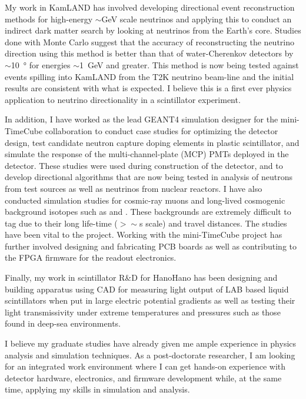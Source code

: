 \documentclass[a4paper,10pt]{article} %
\begin{document}
My work in KamLAND has involved developing directional event reconstruction
methods for high-energy $\sim$\si{\giga\electronvolt} scale neutrinos and
applying this to conduct an indirect dark matter search by looking at neutrinos
from the Earth's core.
Studies done with Monte Carlo suggest that the accuracy of reconstructing the
neutrino direction using this method is better than that of water-Cherenkov
detectors by $\sim$\SI{10}{\degree} for energies
$\sim$\SI{1}{\giga\electronvolt} and greater.
This method is now being tested against events spilling into KamLAND from the
T2K neutrino beam-line and the initial results are consistent with what is
expected.
I believe this is a first ever physics application to neutrino directionality in
a scintillator experiment.

In addition, I have worked as the lead GEANT4 simulation designer for the
mini-TimeCube collaboration to conduct case studies for optimizing the detector
design, test candidate neutron capture doping elements in plastic
scintillator, and simulate the response of the multi-channel-plate (MCP) PMTs
deployed in the detector.
These studies were used during construction of the detector, and to develop
directional algorithms that are now being tested in analysis of neutrons from
test sources as well as neutrinos from nuclear reactors.
I have also conducted simulation studies for cosmic-ray muons and long-lived
cosmogenic background isotopes such as  and .
These backgrounds are extremely difficult to tag due to their long life-time
($>\sim$\si{\second} scale) and travel distances.
The studies have been vital to the project.
Working with the mini-TimeCube project has further involved designing and
fabricating PCB boards as well as contributing to the FPGA firmware for the
readout electronics.

Finally, my work in scintillator R\&D for HanoHano has been designing and
building apparatus using CAD for measuring light output of LAB based liquid
scintillators when put in large electric potential gradients as well as
testing their light transmissivity under extreme temperatures and
pressures such as those found in deep-sea environments.

I believe my graduate studies have already given me ample experience in physics
analysis and simulation techniques. As a post-doctorate researcher, I am looking
for an integrated work environment where I can get hands-on experience with
detector hardware, electronics, and firmware development while, at the same
time, applying my skills in simulation and analysis.
\end{document}
